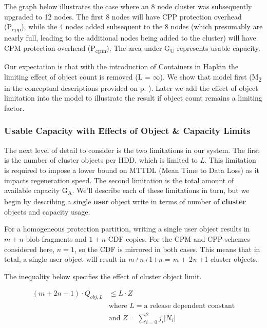 The graph below illustrates the case where an 8 node cluster was subsequently upgraded to 12 nodes. The first 8 nodes will have CPP protection overhead (P\textsubscript{cpp}), while the 4 nodes added subsequent to the 8 nodes (which presumably are nearly full, leading to the additional nodes being added to the cluster) will have CPM protection overhead (P\textsubscript{cpm}). The area under G\textsubscript{U} represents usable capacity.


\begin{center}
\resizebox{.65\linewidth}{!}{}
\end{center}
Our expectation is that with the introduction of Containers in Hapkin the limiting effect of object count is removed (L = \(\infty\)). We show that model first (M\textsubscript{2} in the conceptual descriptions provided on p. \pageref{models-1}). Later we add the effect of object limitation into the model to illustrate the result if object count remains a limiting factor.

\subsubsection*{Usable Capacity with Effects of Object \& Capacity Limits}

The next level of detail to consider is the two limitations in our system. The first is the number of cluster objects per HDD, which is limited to \emph{L}. This limitation is required to impose a lower bound on MTTDL (Mean Time to Data Loss) as it impacts regeneration speed. The second limitation is the total amount of available capacity G\textsubscript{A}. We'll describe each of these limitations in turn, but we begin by describing a single \textbf{user} object write in terms of number of \textbf{cluster} objects and capacity usage.

For a homogeneous protection partition, writing a single user object results in \(m+n\) blob fragments and \(1+n\) CDF copies. For the CPM and CPP schemes considered here, \(n=1\), so the CDF is mirrored in both cases. This means that in total, a single user object will result in \emph{m+n+}1+\emph{n }= \emph{m }+ 2\emph{n} +1 cluster objects.

The inequality below specifies the effect of cluster object limit.


\nopagebreak
\begin{equation}\label{eq:14}
\begin{aligned}(m+2n+1)\cdot Q_{obj,L}&\leq L\cdot Z\\ &\text{where }L=\text{a release dependent constant}\\ &\text{and }Z=\sum_{i=0}^{2}j_i\lvert N_i\rvert\end{aligned}
\end{equation}
 

